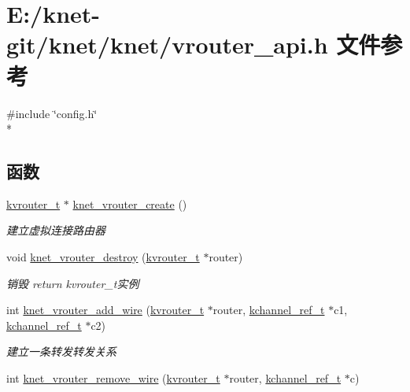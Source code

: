 \hypertarget{a00110}{}\section{E\+:/knet-\/git/knet/knet/vrouter\+\_\+api.h 文件参考}
\label{a00110}
{\ttfamily \#include \char`\"{}config.\+h\char`\"{}}\\*
\subsection*{函数}
\begin{DoxyCompactItemize}
\item 
\hyperlink{a00056_a9863a6202df1fb40e2b32c673ad93267_a9863a6202df1fb40e2b32c673ad93267}{kvrouter\+\_\+t} $\ast$ \hyperlink{a00124_gac2a99e706273f22db2ea363b1700bfab_gac2a99e706273f22db2ea363b1700bfab}{knet\+\_\+vrouter\+\_\+create} ()
\begin{DoxyCompactList}\small\item\em 建立虚拟连接路由器 \end{DoxyCompactList}\item 
void \hyperlink{a00124_gad0660abac611870c1255dcfe9d36f67e_gad0660abac611870c1255dcfe9d36f67e}{knet\+\_\+vrouter\+\_\+destroy} (\hyperlink{a00056_a9863a6202df1fb40e2b32c673ad93267_a9863a6202df1fb40e2b32c673ad93267}{kvrouter\+\_\+t} $\ast$router)
\begin{DoxyCompactList}\small\item\em 销毁 return kvrouter\+\_\+t实例 \end{DoxyCompactList}\item 
int \hyperlink{a00124_ga7256979701c32356201e853b7f3df1ca_ga7256979701c32356201e853b7f3df1ca}{knet\+\_\+vrouter\+\_\+add\+\_\+wire} (\hyperlink{a00056_a9863a6202df1fb40e2b32c673ad93267_a9863a6202df1fb40e2b32c673ad93267}{kvrouter\+\_\+t} $\ast$router, \hyperlink{a00056_a3b7e82599367eade261456f60ebe2cd9_a3b7e82599367eade261456f60ebe2cd9}{kchannel\+\_\+ref\+\_\+t} $\ast$c1, \hyperlink{a00056_a3b7e82599367eade261456f60ebe2cd9_a3b7e82599367eade261456f60ebe2cd9}{kchannel\+\_\+ref\+\_\+t} $\ast$c2)
\begin{DoxyCompactList}\small\item\em 建立一条转发转发关系 \end{DoxyCompactList}\item 
int \hyperlink{a00124_gaa5052bac7f443e497fcc042f13026bfc_gaa5052bac7f443e497fcc042f13026bfc}{knet\+\_\+vrouter\+\_\+remove\+\_\+wire} (\hyperlink{a00056_a9863a6202df1fb40e2b32c673ad93267_a9863a6202df1fb40e2b32c673ad93267}{kvrouter\+\_\+t} $\ast$router, \hyperlink{a00056_a3b7e82599367eade261456f60ebe2cd9_a3b7e82599367eade261456f60ebe2cd9}{kchannel\+\_\+ref\+\_\+t} $\ast$c)

\end{DoxyCompactItemize}
